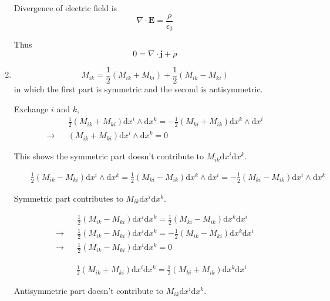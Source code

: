 \documentclass[12pt,a4paper]{article}
\begin{document}
\begin{enumerate}
Divergence of electric field is
\begin{equation}
	\nabla\cdot \mathbf E = \frac \rho {\epsilon_0}
\end{equation}

Thus
\begin{equation}
	0 = \nabla\cdot \mathbf j + \dot{\rho}
\end{equation}


\item

\begin{equation}
	M_{ik} = \frac{1}{2}(M_{ik} + M_{ki}) + \frac{1}{2}(M_{ik} - M_{ki})
\end{equation}
in which the first part is symmetric and the second is antisymmetric.

Exchange $i$ and $k$,
\begin{eqnarray}
	&&\frac12 (M_{ik} + M_{ki})\mathrm dx^i\wedge \mathrm dx^k
	= -\frac12(M_{ki} + M_{ik})\mathrm dx^k\wedge \mathrm dx^i \\
	\rightarrow && (M_{ik} + M_{ki})\mathrm dx^i\wedge \mathrm dx^k = 0
\end{eqnarray}

This shows the symmetric part doesn't contribute to $M_{ik}\mathrm dx^i\mathrm dx^k$.

\begin{eqnarray}
	&&\frac12 (M_{ik} - M_{ki})\mathrm dx^i\wedge \mathrm dx^k
	= \frac12(M_{ki} - M_{ik})\mathrm dx^k\wedge \mathrm dx^i 
	= -\frac12(M_{ki} - M_{ik})\mathrm dx^i\wedge \mathrm dx^k
\end{eqnarray}

Symmetric part contributes to $M_{ik}\mathrm dx^i\mathrm dx^k$.



\begin{eqnarray}
	&&\frac12 (M_{ik} - M_{ki})\mathrm dx^i \mathrm dx^k
	= \frac12(M_{ki} - M_{ik})\mathrm dx^k \mathrm dx^i \\
	\rightarrow && \frac12 (M_{ik} - M_{ki})\mathrm dx^i \mathrm dx^k
	= - \frac12(M_{ik} - M_{ki})\mathrm dx^k \mathrm dx^i \\
	\rightarrow && \frac12 (M_{ik} - M_{ki})\mathrm dx^i \mathrm dx^k =0
\end{eqnarray}


\begin{eqnarray}
	&&\frac12 (M_{ik} + M_{ki})\mathrm dx^i \mathrm dx^k
	= \frac12(M_{ki} + M_{ik})\mathrm dx^k \mathrm dx^i
\end{eqnarray}

Antisymmetric part doesn't contribute to $M_{ik}\mathrm dx^i\mathrm dx^k$.









\end{enumerate}
\end{document}
